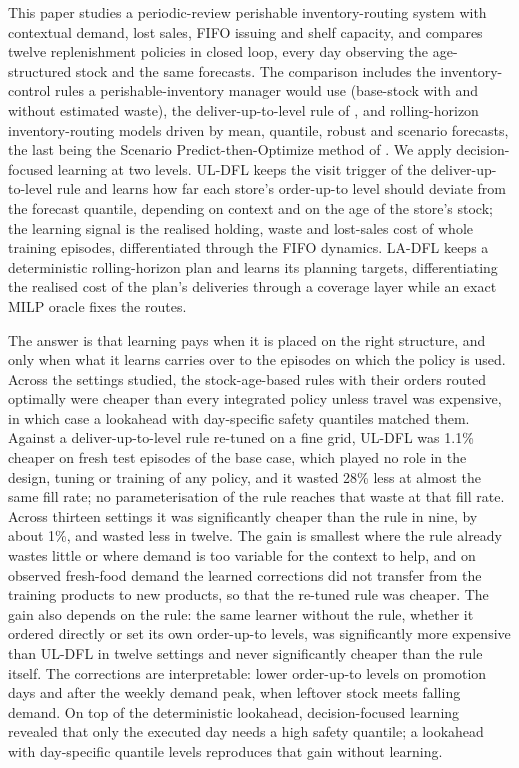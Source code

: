 This paper studies a periodic-review perishable inventory-routing system with contextual demand, lost sales, FIFO issuing and shelf capacity, and compares twelve replenishment policies in closed loop, every day observing the age-structured stock and the same forecasts. The comparison includes the inventory-control rules a perishable-inventory manager would use (base-stock with and without estimated waste), the deliver-up-to-level rule of \citet{crama2018stochastic}, and rolling-horizon inventory-routing models driven by mean, quantile, robust and scenario forecasts, the last being the Scenario Predict-then-Optimize method of \citet{jia2025scenario}. We apply decision-focused learning at two levels. UL-DFL keeps the visit trigger of the deliver-up-to-level rule and learns how far each store's order-up-to level should deviate from the forecast quantile, depending on context and on the age of the store's stock; the learning signal is the realised holding, waste and lost-sales cost of whole training episodes, differentiated through the FIFO dynamics. LA-DFL keeps a deterministic rolling-horizon plan and learns its planning targets, differentiating the realised cost of the plan's deliveries through a coverage layer while an exact MILP oracle fixes the routes.

The answer is that learning pays when it is placed on the right structure, and only when what it learns carries over to the episodes on which the policy is used. Across the settings studied, the stock-age-based rules with their orders routed optimally were cheaper than every integrated policy unless travel was expensive, in which case a lookahead with day-specific safety quantiles matched them. Against a deliver-up-to-level rule re-tuned on a fine grid, UL-DFL was 1.1\% cheaper on fresh test episodes of the base case, which played no role in the design, tuning or training of any policy, and it wasted 28\% less at almost the same fill rate; no parameterisation of the rule reaches that waste at that fill rate. Across thirteen settings it was significantly cheaper than the rule in nine, by about 1\%, and wasted less in twelve. The gain is smallest where the rule already wastes little or where demand is too variable for the context to help, and on observed fresh-food demand the learned corrections did not transfer from the training products to new products, so that the re-tuned rule was cheaper. The gain also depends on the rule: the same learner without the rule, whether it ordered directly or set its own order-up-to levels, was significantly more expensive than UL-DFL in twelve settings and never significantly cheaper than the rule itself. The corrections are interpretable: lower order-up-to levels on promotion days and after the weekly demand peak, when leftover stock meets falling demand. On top of the deterministic lookahead, decision-focused learning revealed that only the executed day needs a high safety quantile; a lookahead with day-specific quantile levels reproduces that gain without learning.

